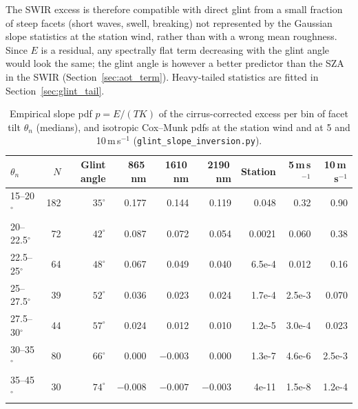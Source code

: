 \documentclass[11pt,a4paper]{article}
\newcommand{\code}[1]{\texttt{#1}}
\begin{document}
The SWIR excess is therefore compatible with direct glint from a small fraction of steep facets (short waves,
swell, breaking) not represented by the Gaussian slope statistics at the station wind, rather than with a wrong
mean roughness. Since $E$ is a residual, any spectrally flat term decreasing with the glint angle would look the
same; the glint angle is however a better predictor than the SZA in the SWIR (Section~\ref{sec:aot_term}).
Heavy-tailed statistics are fitted in Section~\ref{sec:glint_tail}.

\begin{table}[h]
\centering\small
\caption{Empirical slope pdf $p = E/(TK)$ of the cirrus-corrected excess per bin of facet tilt $\theta_n$
(medians), and isotropic Cox--Munk pdfs at the station wind and at 5 and 10\,m\,s$^{-1}$
(\code{glint\_slope\_inversion.py}).}
\label{tab:glint_pdf}
\begin{tabular}{lrrrrrrrr}
\toprule
$\theta_n$ & $N$ & Glint angle & 865\,nm & 1610\,nm & 2190\,nm & Station & 5\,m\,s$^{-1}$ & 10\,m\,s$^{-1}$ \\
\midrule
15--20$^\circ$   & 182 & $35^\circ$ & 0.177  & 0.144   & 0.119   & 0.048  & 0.32  & 0.90 \\
20--22.5$^\circ$ & 72  & $42^\circ$ & 0.087  & 0.072   & 0.054   & 0.0021 & 0.060 & 0.38 \\
22.5--25$^\circ$ & 64  & $48^\circ$ & 0.067  & 0.049   & 0.040   & 6.5e-4 & 0.012 & 0.16 \\
25--27.5$^\circ$ & 39  & $52^\circ$ & 0.036  & 0.023   & 0.024   & 1.7e-4 & 2.5e-3 & 0.070 \\
27.5--30$^\circ$ & 44  & $57^\circ$ & 0.024  & 0.012   & 0.010   & 1.2e-5 & 3.0e-4 & 0.023 \\
30--35$^\circ$   & 80  & $66^\circ$ & 0.000  & $-0.003$ & 0.000  & 1.3e-7 & 4.6e-6 & 2.5e-3 \\
35--45$^\circ$   & 30  & $74^\circ$ & $-0.008$ & $-0.007$ & $-0.003$ & 4e-11 & 1.5e-8 & 1.2e-4 \\
\bottomrule
\end{tabular}
\end{table}
\end{document}
